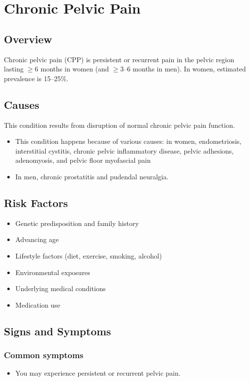 \chapter{Chronic Pelvic Pain}
\label{sec:Chronic Pelvic Pain}

\section{Overview}
Chronic pelvic pain (CPP) is persistent or recurrent pain in the pelvic region lasting $\ge$6 months in women (and $\ge$3--6 months in men). In women, estimated prevalence is 15--25\%.
\section{Causes}
This condition results from disruption of normal chronic pelvic pain function.

\begin{itemize}[noitemsep]
  \item This condition happens because of various causes: in women, endometriosis, interstitial cystitis, chronic pelvic inflammatory disease, pelvic adhesions, adenomyosis, and pelvic floor myofascial pain
  \item In men, chronic prostatitis and pudendal neuralgia.
\end{itemize}
\section{Risk Factors}


\begin{itemize}[noitemsep]
  \item Genetic predisposition and family history
  \item Advancing age
  \item Lifestyle factors (diet, exercise, smoking, alcohol)
  \item Environmental exposures
  \item Underlying medical conditions
  \item Medication use
\end{itemize}
\section{Signs and Symptoms}

\subsection{Common symptoms}
\begin{itemize}[noitemsep]
  \item You may experience persistent or recurrent pelvic pain. 
  \end{itemize}

